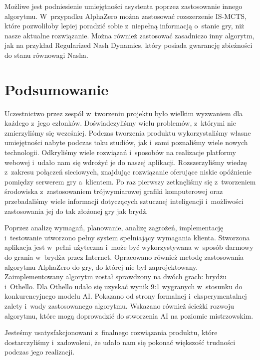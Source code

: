 Możliwe jest podniesienie umiejętności asystenta poprzez
zastosowanie innego algorytmu. W~przypadku AlphaZero
można zastosować rozszerzenie IS-MCTS, które pozwoliłoby
lepiej poradzić sobie z~niepełną informacją o~stanie gry,
niż nasze aktualne rozwiązanie.
Można również zastosować zasadniczo inny algorytm,
jak na przykład Regularized Nash Dynamics,
który posiada gwarancję zbieżności do stanu
równowagi Nasha.

\section{Podsumowanie}

Uczestnictwo przez zespół w~tworzeniu projektu
było wielkim wyzwaniem dla każdego z~jego członków.
Doświadczyliśmy wielu problemów, z~którymi nie
zmierzyliśmy się wcześniej. Podczas tworzenia
produktu wykorzystaliśmy własne umiejętności nabyte podczas
toku studiów, jak i~sami poznaliśmy wiele nowych technologii.
Odkryliśmy wiele rozwiązań i~sposobów na realizacje
platformy webowej i~udało nam się wdrożyć je do naszej aplikacji.
Rozszerzyliśmy wiedzę z~zakresu połączeń sieciowych, znajdując
rozwiązanie oferujące niskie opóźnienie pomiędzy serwerem gry
a~klientem. Po raz pierwszy zetknęliśmy się z~tworzeniem
środowiska z~zastosowaniem trójwymiarowej grafiki komputerowej
oraz przebadaliśmy wiele informacji dotyczących sztucznej
inteligencji i~możliwości zastosowania jej do tak złożonej gry
jak brydż.

Poprzez analizę
wymagań, planowanie, analizę zagrożeń, implementację
i~testowanie utworzono pełny system spełniający wymagania
klienta.
Stworzona aplikacja jest w~pełni użyteczna i~może być
wykorzystywana w~sposób darmowy do grania w~brydża przez Internet.
Opracowano również metodę zastosowania algorytmu AlphaZero
do gry, do której nie był zaprojektowany.
Zaimplementowany algorytm został sprawdzony na dwóch grach: brydżu i~Othello.
Dla Othello udało się uzyskać wynik 9:1 wygranych w~stosunku do konkurencyjnego
modelu AI.
Pokazano od strony formalnej i~eksperymentalnej zalety i~wady zastosowanego algorytmu.
Wskazano również ścieżki rozwoju algorytmu, które mogą
doprowadzić do stworzenia AI na poziomie mistrzowskim.

Jesteśmy usatysfakcjonowani z~finalnego rozwiązania produktu,
które dostarczyliśmy i~zadowoleni, że udało nam się pokonać
większość trudności podczas jego realizacji.



